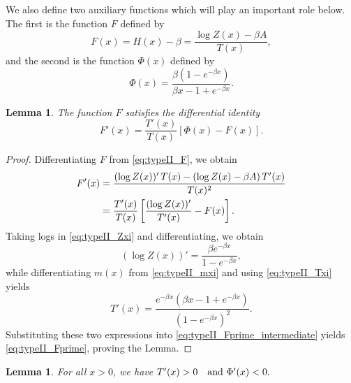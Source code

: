 \documentclass[10pt,a4paper]{amsart}
\newtheorem{lem}[thm]{Lemma}
\theoremstyle{definition}
\theoremstyle{remark}
\numberwithin{equation}{section}
\begin{document}
We also define two auxiliary functions which will play an important role below. The first is the function \(F\) defined by
\begin{equation}
F(x)
=
H(x)-\beta
=
\frac{
\log Z(x)-\beta A
}{
T(x)
},
\label{eq:typeII_F}
\end{equation}
and the second is the function \(\Phi(x)\) defined by
\begin{equation}
\Phi(x)
=
\frac{
\beta(1-e^{-\beta x})
}{
\beta x-1+e^{-\beta x}
}.
\label{eq:typeII_Phi}
\end{equation}


\begin{lem}
\label{lem_derivative_F}
The function 
\(
F
\)
satisfies the differential identity
\begin{equation}
F'(x)
=
\frac{T'(x)}{T(x)}
\left[
\Phi(x)-F(x)
\right].
\label{eq:typeII_Fprime}
\end{equation}

\end{lem}

\begin{proof}
Differentiating $F$ from 
\eqref{eq:typeII_F}, we obtain
\begin{align}
F'(x)
&=
\frac{
(\log Z(x))' \, T(x)
-
(\log Z(x)-\beta A) \, T'(x)
}{
T(x)^2
}
\notag\\
&=
\frac{T'(x)}{T(x)}
\left[
\frac{(\log Z(x))'}{T'(x)}
-
F(x)
\right].
\label{eq:typeII_Fprime_intermediate}
\end{align}
Taking logs in \eqref{eq:typeII_Zxi} and differentiating, we obtain 
\begin{equation}
(\log Z(x))'
=
\frac{
\beta e^{-\beta x}
}{
1-e^{-\beta x}
},
\label{eq:typeII_logZprime}
\end{equation}
while differentiating $m(x)$ from 
\eqref{eq:typeII_mxi}
and using
\eqref{eq:typeII_Txi}
yields
\begin{equation}
T'(x)
=
\frac{
e^{-\beta x}
(
\beta x-1+e^{-\beta x}
)
}{
(1-e^{-\beta x})^2}.
\label{eq:typeII_Tprime}
\end{equation}
Substituting these two expressions into 
\eqref{eq:typeII_Fprime_intermediate}
yields
\eqref{eq:typeII_Fprime}, proving the Lemma.
\end{proof}


\begin{lem}
\label{lem_positivity}
 For all $x > 0$, we have 
$ T'(x)>0  \quad {\rm and }  \  
\Phi'(x)<0. $
\end{lem}
\end{document}
